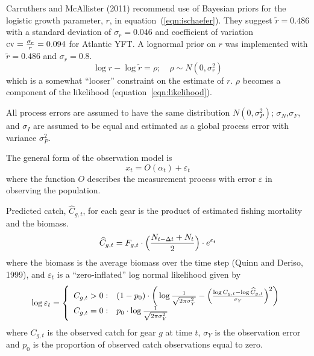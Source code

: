 \documentclass[12pt,letterpaper]{article}
\begin{document}
Carruthers and McAllister (2011) recommend use of Bayesian priors for the
logistic growth parameter, $r$, in equation~(\ref{eqn:ischaefer}). They
suggest $\tilde{r} = 0.486$ with a standard deviation of $\sigma_r = 0.046$
and coefficient of variation ${\rm cv}=\frac{\sigma_r}{r}=0.094$ for Atlantic YFT.
A lognormal prior on $r$ was implemented with 
$\tilde{r} = 0.486$ and $\sigma_r = 0.8$.
\begin{equation}
\log r - \log \tilde{r} = \rho ;\quad \rho\sim N(0,\sigma^2_r)
\end{equation}
which is a somewhat ``looser'' constraint on the estimate of $r$.
$\rho$ becomes a component of the likelihood
(equation~\ref{eqn:likelihood}).

All process errors are assumed to have the same distribution
$N(0,\sigma^2_P)$; $\sigma_N$,$\sigma_F$, and $\sigma_I$ are assumed
to be equal and estimated as a global process error with variance
$\sigma^2_P$.

The general form of the observation model is
\begin{equation}
x_t = O(\alpha_t) + \varepsilon_t
\end{equation}
where the function $O$ describes the measurement process with
error $\varepsilon$ in observing the population.

Predicted catch, $\widehat{C}_{g,t}$, for each gear is the product of
estimated fishing mortality and the biomass.
\begin{equation}
\widehat{C}_{g,t} = F_{g,t}\cdot\Bigl(\frac{N_{t-\Delta
t}+N_t}{2}\Bigr) \cdot e^{\varepsilon_t}
\label{eqn:obs1}
\end{equation}
where the biomass is  the average
biomass over the time step (Quinn and Deriso, 1999), and
$\varepsilon_t$ is a ``zero-inflated'' log normal likelihood given by
\begin{equation}
  \log \varepsilon_t = \left\{
    \begin{array}{r@{\;:\quad}l}
       C_{g,t} > 0 &
(1-p_0)\cdot\bigg(\log\frac{1}{\sqrt{2\pi\sigma^2_Y}}
          -\Bigl(\frac{\log
C_{g,t}-\log\widehat{C}_{g,t}}{\sigma_Y}\Bigr)^2\bigg)\\
       C_{g,t} = 0 & p_0 \cdot\log \frac{1}{\sqrt{2\pi\sigma^2_Y}}\\
    \end{array}
  \right.
\end{equation}
where $C_{g,t}$ is the observed catch for gear $g$ at time $t$,
$\sigma_Y$ is the observation error and
$p_0$ is the proportion of observed catch observations equal to zero.
\end{document}
